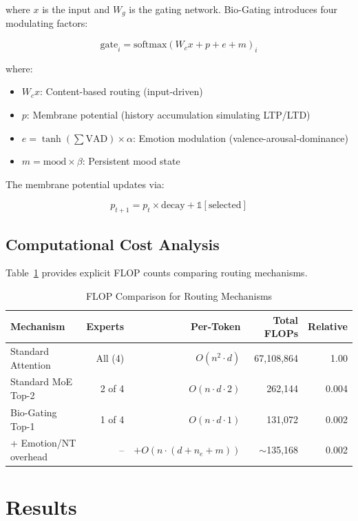 \documentclass[10pt,a4paper]{article}
\begin{document}
where $x$ is the input and $W_g$ is the gating network. Bio-Gating introduces four modulating factors:

\begin{equation}
\text{gate}_i = \text{softmax}(W_c x + p + e + m)_i
\end{equation}

where:
\begin{itemize}
\item $W_c x$: Content-based routing (input-driven)
\item $p$: Membrane potential (history accumulation simulating LTP/LTD)
\item $e = \tanh(\sum \text{VAD}) \times \alpha$: Emotion modulation (valence-arousal-dominance)
\item $m = \text{mood} \times \beta$: Persistent mood state
\end{itemize}

The membrane potential updates via:

\begin{equation}
p_{t+1} = p_t \times \text{decay} + \mathbb{1}[\text{selected}]
\end{equation}

\subsection{Computational Cost Analysis}

Table~\ref{tab:flop} provides explicit FLOP counts comparing routing mechanisms.

\begin{table}[htbp]
\centering
\caption{FLOP Comparison for Routing Mechanisms}
\label{tab:flop}
\begin{tabular}{lrrrr}
\toprule
\textbf{Mechanism} & \textbf{Experts} & \textbf{Per-Token} & \textbf{Total FLOPs} & \textbf{Relative} \\
\midrule
Standard Attention & All (4) & $O(n^2 \cdot d)$ & 67,108,864 & 1.00 \\
Standard MoE Top-2 & 2 of 4 & $O(n \cdot d \cdot 2)$ & 262,144 & 0.004 \\
Bio-Gating Top-1 & 1 of 4 & $O(n \cdot d \cdot 1)$ & 131,072 & 0.002 \\
+ Emotion/NT overhead & -- & $+O(n \cdot (d+n_e+m))$ & $\sim$135,168 & 0.002 \\
\bottomrule
\end{tabular}
\end{table}

\section{Results}
\end{document}
